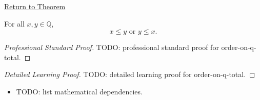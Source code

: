 \newpage
{}
\label{prf:order-on-q-total}

\begin{remark*}[Return]
\hyperref[thm:order-on-q-total]{Return to Theorem}
\end{remark*}

\begin{theorem*}
For all $x,y\in\mathbb{Q}$,
\[
x\le y\text{ or }y\le x.
\]
\end{theorem*}

\begin{proof}[Professional Standard Proof]
\LRAProofBodyStart
TODO: professional standard proof for order-on-q-total.
\end{proof}

\begin{proof}[Detailed Learning Proof]
\LRAProofBodyStart
TODO: detailed learning proof for order-on-q-total.
\end{proof}

\begin{remark*}
\end{remark*}

\begin{dependencies}
\begin{itemize}
  \item TODO: list mathematical dependencies.
\end{itemize}
\end{dependencies}

\clearpage
